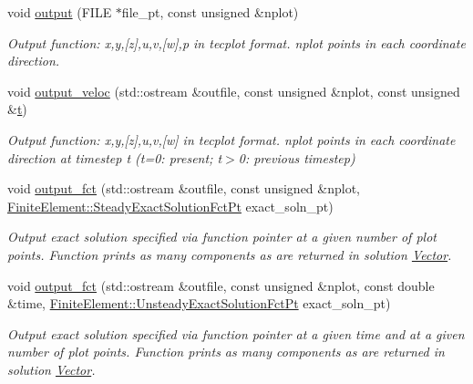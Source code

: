 \begin{DoxyCompactItemize}
void \hyperlink{classoomph_1_1AxisymmetricNavierStokesEquations_abc2ca00250845e243da3f4e0845b2c96}{output} (F\+I\+LE $\ast$file\+\_\+pt, const unsigned \&nplot)
\begin{DoxyCompactList}\small\item\em Output function\+: x,y,\mbox{[}z\mbox{]},u,v,\mbox{[}w\mbox{]},p in tecplot format. nplot points in each coordinate direction. \end{DoxyCompactList}\item 
void \hyperlink{classoomph_1_1AxisymmetricNavierStokesEquations_a3993d25e1ae47080505ec2570ba8c41f}{output\+\_\+veloc} (std\+::ostream \&outfile, const unsigned \&nplot, const unsigned \&\hyperlink{cfortran_8h_af6f0bd3dc13317f895c91323c25c2b8f}{t})
\begin{DoxyCompactList}\small\item\em Output function\+: x,y,\mbox{[}z\mbox{]},u,v,\mbox{[}w\mbox{]} in tecplot format. nplot points in each coordinate direction at timestep t (t=0\+: present; t$>$0\+: previous timestep) \end{DoxyCompactList}\item 
void \hyperlink{classoomph_1_1AxisymmetricNavierStokesEquations_a454a2d627bad75944359e90be0a535a5}{output\+\_\+fct} (std\+::ostream \&outfile, const unsigned \&nplot, \hyperlink{classoomph_1_1FiniteElement_a690fd33af26cc3e84f39bba6d5a85202}{Finite\+Element\+::\+Steady\+Exact\+Solution\+Fct\+Pt} exact\+\_\+soln\+\_\+pt)
\begin{DoxyCompactList}\small\item\em Output exact solution specified via function pointer at a given number of plot points. Function prints as many components as are returned in solution \hyperlink{classoomph_1_1Vector}{Vector}. \end{DoxyCompactList}\item 
void \hyperlink{classoomph_1_1AxisymmetricNavierStokesEquations_a4a706a0922fc624f337fc5e5376002ae}{output\+\_\+fct} (std\+::ostream \&outfile, const unsigned \&nplot, const double \&time, \hyperlink{classoomph_1_1FiniteElement_ad4ecf2b61b158a4b4d351a60d23c633e}{Finite\+Element\+::\+Unsteady\+Exact\+Solution\+Fct\+Pt} exact\+\_\+soln\+\_\+pt)
\begin{DoxyCompactList}\small\item\em Output exact solution specified via function pointer at a given time and at a given number of plot points. Function prints as many components as are returned in solution \hyperlink{classoomph_1_1Vector}{Vector}. \end{DoxyCompactList}\item 

\end{DoxyCompactItemize}
